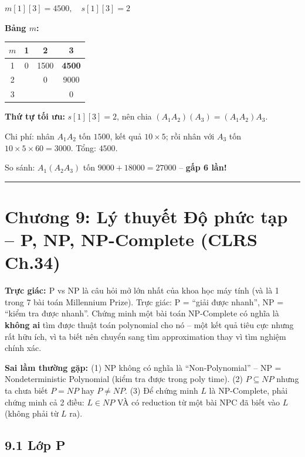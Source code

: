 \documentclass[10pt]{article}
\newcommand{\intuition}[1]{%
  \begin{tcolorbox}[colback=blue!5!white, colframe=blue!60!white, leftrule=3pt,
    toprule=0pt, bottomrule=0pt, rightrule=0pt,
    boxsep=2pt, left=6pt, right=6pt, top=4pt, bottom=4pt]
  \small\textbf{\textcolor{blue!80!black}{Trực giác: }}#1
  \end{tcolorbox}}
\newcommand{\pitfall}[1]{%
  \begin{tcolorbox}[colback=red!5!white, colframe=red!60!white, leftrule=3pt,
    toprule=0pt, bottomrule=0pt, rightrule=0pt,
    boxsep=2pt, left=6pt, right=6pt, top=4pt, bottom=4pt]
  \small\textbf{\textcolor{red!70!black}{Sai lầm thường gặp: }}#1
  \end{tcolorbox}}
\begin{document}
$m[1][3] = \boxed{4500}, \quad s[1][3] = 2$

\textbf{Bảng $m$:}
\begin{center}
\begin{tabular}{|c|c|c|c|}
\hline
$m$ & 1 & 2 & 3 \\
\hline
1 & 0 & 1500 & \textbf{4500} \\
\hline
2 & & 0 & 9000 \\
\hline
3 & & & 0 \\
\hline
\end{tabular}
\end{center}

\textbf{Thứ tự tối ưu:} $s[1][3] = 2$, nên chia $(A_1 A_2)(A_3) = \boxed{(A_1 A_2) A_3}$.

Chi phí: nhân $A_1 A_2$ tốn $1500$, kết quả $10 \times 5$; rồi nhân với $A_3$ tốn $10 \times 5 \times 60 = 3000$. Tổng: $4500$.

So sánh: $A_1(A_2 A_3)$ tốn $9000 + 18000 = 27000$ -- \textbf{gấp 6 lần!}

\begin{center}\rule{0.5\linewidth}{0.5pt}\end{center}

\section{Chương 9: Lý thuyết Độ phức tạp -- P, NP, NP-Complete (CLRS Ch.34)}\label{chux1b0ux1a1ng-9-p-np-np-complete-clrs-ch.34}

\intuition{P vs NP là câu hỏi mở lớn nhất của khoa học máy tính (và là 1 trong 7 bài toán Millennium Prize). Trực giác: P = ``giải được nhanh'', NP = ``kiểm tra được nhanh''. Chứng minh một bài toán NP-Complete có nghĩa là \textbf{không ai} tìm được thuật toán polynomial cho nó -- một kết quả tiêu cực nhưng rất hữu ích, vì ta biết nên chuyển sang tìm approximation thay vì tìm nghiệm chính xác.}

\pitfall{(1) NP không có nghĩa là ``Non-Polynomial'' -- NP = Nondeterministic Polynomial (kiểm tra được trong poly time). (2) $P \subseteq NP$ nhưng ta chưa biết $P = NP$ hay $P \neq NP$. (3) Để chứng minh $L$ là NP-Complete, phải chứng minh cả 2 điều: $L \in NP$ VÀ có reduction từ một bài NPC đã biết vào $L$ (không phải từ $L$ ra).}

\subsection{9.1 Lớp P}\label{lux1edbp-p}
\end{document}
